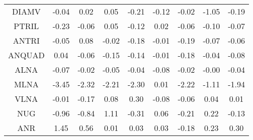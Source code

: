 \documentclass[11pt,a4paper]{report}
\begin{document}
\begin{longtable}{ | c || c | c | c | c | c | c | c || c |}
DIAMV &  \cellcolor[HTML]{FFFFFF} -0.04 &  \cellcolor[HTML]{FFFFFF} 0.02 &  \cellcolor[HTML]{FFFFFF} 0.05 &  \cellcolor[HTML]{FFF7F7} -0.21 &  \cellcolor[HTML]{FFFFFF} -0.12 &  \cellcolor[HTML]{FFFFFF} -0.02 &  \cellcolor[HTML]{FFE7E7} -1.05 &  \cellcolor[HTML]{FFF7F7} -0.19 \\
PTRIL &  \cellcolor[HTML]{FFF7F7} -0.23 &  \cellcolor[HTML]{FFFFFF} -0.06 &  \cellcolor[HTML]{FFFFFF} 0.05 &  \cellcolor[HTML]{FFFFFF} -0.12 &  \cellcolor[HTML]{FFFFFF} 0.02 &  \cellcolor[HTML]{FFFFFF} -0.06 &  \cellcolor[HTML]{FFFFFF} -0.10 &  \cellcolor[HTML]{FFFFFF} -0.07 \\
ANTRI &  \cellcolor[HTML]{FFFFFF} -0.05 &  \cellcolor[HTML]{FFFFFF} 0.08 &  \cellcolor[HTML]{FFFFFF} -0.02 &  \cellcolor[HTML]{FFF7F7} -0.18 &  \cellcolor[HTML]{FFFFFF} -0.01 &  \cellcolor[HTML]{FFF7F7} -0.19 &  \cellcolor[HTML]{FFFFFF} -0.07 &  \cellcolor[HTML]{FFFFFF} -0.06 \\
ANQUAD &  \cellcolor[HTML]{FFFFFF} 0.04 &  \cellcolor[HTML]{FFFFFF} -0.06 &  \cellcolor[HTML]{FFFFFF} -0.15 &  \cellcolor[HTML]{FFFFFF} -0.14 &  \cellcolor[HTML]{FFFFFF} -0.01 &  \cellcolor[HTML]{FFF7F7} -0.18 &  \cellcolor[HTML]{FFFFFF} -0.04 &  \cellcolor[HTML]{FFFFFF} -0.08 \\
ALNA &  \cellcolor[HTML]{FFFFFF} -0.07 &  \cellcolor[HTML]{FFFFFF} -0.02 &  \cellcolor[HTML]{FFFFFF} -0.05 &  \cellcolor[HTML]{FFFFFF} -0.04 &  \cellcolor[HTML]{FFFFFF} -0.08 &  \cellcolor[HTML]{FFFFFF} -0.02 &  \cellcolor[HTML]{FFFFFF} -0.00 &  \cellcolor[HTML]{FFFFFF} -0.04 \\
MLNA &  \cellcolor[HTML]{FFA7A7} -3.45 &  \cellcolor[HTML]{FFC7C7} -2.32 &  \cellcolor[HTML]{FFC7C7} -2.21 &  \cellcolor[HTML]{FFC7C7} -2.30 &  \cellcolor[HTML]{FFFFFF} 0.01 &  \cellcolor[HTML]{FFC7C7} -2.22 &  \cellcolor[HTML]{FFDFDF} -1.11 &  \cellcolor[HTML]{FFCFCF} -1.94 \\
VLNA &  \cellcolor[HTML]{FFFFFF} -0.01 &  \cellcolor[HTML]{FFF7F7} -0.17 &  \cellcolor[HTML]{FFFFFF} 0.08 &  \cellcolor[HTML]{F7F7FF} 0.30 &  \cellcolor[HTML]{FFFFFF} -0.08 &  \cellcolor[HTML]{FFFFFF} -0.06 &  \cellcolor[HTML]{FFFFFF} 0.04 &  \cellcolor[HTML]{FFFFFF} 0.01 \\
NUG &  \cellcolor[HTML]{FFE7E7} -0.96 &  \cellcolor[HTML]{FFE7E7} -0.84 &  \cellcolor[HTML]{DFDFFF} 1.11 &  \cellcolor[HTML]{FFF7F7} -0.31 &  \cellcolor[HTML]{FFFFFF} 0.06 &  \cellcolor[HTML]{FFF7F7} -0.21 &  \cellcolor[HTML]{F7F7FF} 0.22 &  \cellcolor[HTML]{FFFFFF} -0.13 \\
ANR &  \cellcolor[HTML]{D7D7FF} 1.45 &  \cellcolor[HTML]{EFEFFF} 0.56 &  \cellcolor[HTML]{FFFFFF} 0.01 &  \cellcolor[HTML]{FFFFFF} 0.03 &  \cellcolor[HTML]{FFFFFF} 0.03 &  \cellcolor[HTML]{FFF7F7} -0.18 &  \cellcolor[HTML]{F7F7FF} 0.23 &  \cellcolor[HTML]{F7F7FF} 0.30 \\

\end{longtable}
\end{document}
